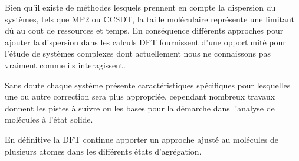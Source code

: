 	Bien qu'il existe de méthodes lesquels prennent en compte la dispersion du systèmes, tels que MP2 ou CCSDT, la taille moléculaire représente une limitant dû au cout de ressources et temps. En conséquence différents approches pour ajouter la dispersion dans les calculs DFT fournissent d'une opportunité pour l'étude de systèmes complexes dont actuellement nous ne connaissons pas vraiment comme ils interagissent. 
	\bigskip
	
	Sans doute chaque système présente caractéristiques spécifiques pour lesquelles une ou autre correction sera plus appropriée, cependant nombreux travaux donnent les pistes à suivre ou les bases pour la démarche dans l'analyse de molécules à l'état solide. 
	\bigskip
	
	En définitive la DFT continue apporter un approche ajusté au molécules de plusieurs atomes dans les différents états d'agrégation. 
